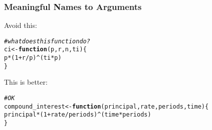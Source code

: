 \documentclass[12pt]{beamer}\usepackage[]{graphicx}\usepackage[]{color}
\makeatletter
\newcommand{\hlnum}[1]{\textcolor[rgb]{0.686,0.059,0.569}{#1}}%
\newcommand{\hlcom}[1]{\textcolor[rgb]{0.678,0.584,0.686}{\textit{#1}}}%
\newcommand{\hlopt}[1]{\textcolor[rgb]{0,0,0}{#1}}%
\newcommand{\hlstd}[1]{\textcolor[rgb]{0.345,0.345,0.345}{#1}}%
\newcommand{\hlkwa}[1]{\textcolor[rgb]{0.161,0.373,0.58}{\textbf{#1}}}%
\newcommand{\hlkwb}[1]{\textcolor[rgb]{0.69,0.353,0.396}{#1}}%
\newcommand{\hlkwc}[1]{\textcolor[rgb]{0.333,0.667,0.333}{#1}}%
\newenvironment{kframe}{%
 \def\at@end@of@kframe{}%
 \ifinner\ifhmode%
  \def\at@end@of@kframe{\end{minipage}}%
  \begin{minipage}{\columnwidth}%
 \fi\fi%
 \def\FrameCommand##1{\hskip\@totalleftmargin \hskip-\fboxsep
 \colorbox{shadecolor}{##1}\hskip-\fboxsep
     \hskip-\linewidth \hskip-\@totalleftmargin \hskip\columnwidth}%
 \MakeFramed {\advance\hsize-\width
   \@totalleftmargin\z@ \linewidth\hsize
   \@setminipage}}%
 {\par\unskip\endMakeFramed%
 \at@end@of@kframe}
\newenvironment{knitrout}{}{} %
\makeatother
\begin{document}

\begin{frame}[fragile]
\frametitle{Meaningful Names to Arguments}

Avoid this:
\begin{knitrout}\footnotesize
{}\color{fgcolor}\begin{kframe}
\begin{alltt}
\hlcom{# what does this function do?}
\hlstd{ci} \hlkwb{<-} \hlkwa{function}\hlstd{(}\hlkwc{p}\hlstd{,} \hlkwc{r}\hlstd{,} \hlkwc{n}\hlstd{,} \hlkwc{ti}\hlstd{) \{}
  \hlstd{p} \hlopt{*} \hlstd{(}\hlnum{1} \hlopt{+} \hlstd{r}\hlopt{/}\hlstd{p)}\hlopt{^}\hlstd{(ti} \hlopt{*} \hlstd{p)}
\hlstd{\}}
\end{alltt}
\end{kframe}
\end{knitrout}

\pause
This is better:
\begin{knitrout}\footnotesize
{}\color{fgcolor}\begin{kframe}
\begin{alltt}
\hlcom{# OK}
\hlstd{compound_interest} \hlkwb{<-} \hlkwa{function}\hlstd{(}\hlkwc{principal}\hlstd{,} \hlkwc{rate}\hlstd{,} \hlkwc{periods}\hlstd{,} \hlkwc{time}\hlstd{) \{}
  \hlstd{principal} \hlopt{*} \hlstd{(}\hlnum{1} \hlopt{+} \hlstd{rate}\hlopt{/}\hlstd{periods)}\hlopt{^}\hlstd{(time} \hlopt{*} \hlstd{periods)}
\hlstd{\}}
\end{alltt}
\end{kframe}
\end{knitrout}

\end{frame}

\end{document}
